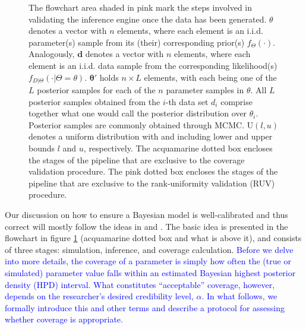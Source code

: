 \documentclass[oneside]{article}
\begin{document}
\begin{figure}
{    The flowchart area shaded in pink mark the steps involved in validating the inference engine once the data has been generated.
    $\theta$ denotes a vector with $n$ elements, where each element is an i.i.d. parameter(s) sample from its (their) corresponding prior(s) $f_\Theta(\cdot)$.
    Analogously, $\boldsymbol{d}$ denotes a vector with $n$ elements, where each element is an i.i.d. data sample from the corresponding likelihood(s) $f_{D|\Theta}(\cdot|\Theta\mathop{=}\theta)$.
    $\boldsymbol{\theta}'$ holds $n \times L$ elements, with each being one of the $L$ posterior samples for each of the $n$ parameter samples in $\theta$.
    All $L$ posterior samples obtained from the $i$-th data set $d_i$ comprise together what one would call the posterior distribution over $\theta_i$.
    Posterior samples are commonly obtained through MCMC.
    $\text{U}(l, u)$ denotes a uniform distribution with and including lower and upper bounds $l$ and $u$, respectively.
    The acquamarine dotted box encloses the stages of the pipeline that are exclusive to the coverage validation procedure.
    The pink dotted box encloses the stages of the pipeline that are exclusive to the rank-uniformity validation (RUV) procedure.}
\label{fig:flowchart}
\vspace{2cm}
\end{figure}

\vspace{.25cm}


Our discussion on how to ensure a Bayesian model is well-calibrated and thus correct will mostly follow the ideas in \citet{cook06}
and \citet{Talts2018}.
The basic idea is presented in the flowchart in figure \ref{fig:flowchart} (acquamarine dotted box and what is above it), and consists of three stages: simulation, inference, and coverage calculation.
\textcolor{blue}{Before we delve into more details, the coverage of a parameter is simply how often the (true or simulated) parameter value falls within an estimated Bayesian highest posterior density (HPD) interval.
What constitutes ``acceptable'' coverage, however, depends on the researcher's desired credibility level, $\alpha$.
In what follows, we formally introduce this and other terms and describe a protocol for assessing whether coverage is appropriate.}
\end{document}
